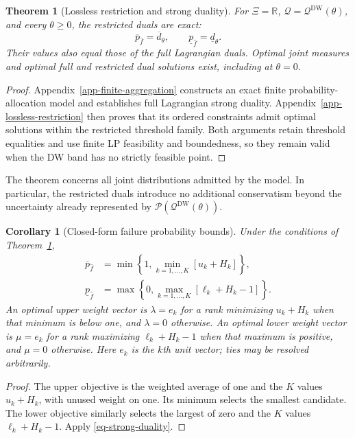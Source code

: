 \documentclass[review,11pt,3p,authoryear,nopreprintline]{elsarticle}
\newtheorem{theorem}{Theorem}
\newtheorem{corollary}{Corollary}
\begin{document}
\begin{theorem}[Lossless restriction and strong duality]
  \label{thm-finite-dual-reformulations}
  For $\Xi=\mathbb R$, $\mathscr Q=\mathscr Q^{\mathrm{DW}}(\theta)$, and every $\theta\ge0$, the restricted duals are exact:
  \begin{equation}
    \overline p_{\hat f}=\overline d_\theta,\qquad
    \underline p_{\hat f}=\underline d_\theta.
    \label{eq-strong-duality}
  \end{equation}
  Their values also equal those of the full Lagrangian duals. Optimal joint measures and optimal full and restricted dual solutions exist, including at $\theta=0$.
\end{theorem}
\begin{proof}
  Appendix~\ref{app-finite-aggregation} constructs an exact finite probability-allocation model and establishes full Lagrangian strong duality. Appendix~\ref{app-lossless-restriction} then proves that its ordered constraints admit optimal solutions within the restricted threshold family. Both arguments retain threshold equalities and use finite LP feasibility and boundedness, so they remain valid when the DW band has no strictly feasible point.
\end{proof}

The theorem concerns all joint distributions admitted by the model. In particular, the restricted duals introduce no additional conservatism beyond the uncertainty already represented by $\mathscr P\left(\mathscr Q^{\mathrm{DW}}(\theta)\right)$.

\begin{corollary}[Closed-form failure probability bounds]
  \label{thm-closed-form-bounds}
  Under the conditions of Theorem~\ref{thm-finite-dual-reformulations},
  \begin{align}
    \overline p_{\hat f}
    &=\min\left\{1,\min_{k=1,\ldots,K}\left[u_k+H_k\right]\right\},
    \label{eq-dw-closed-upper}\\
    \underline p_{\hat f}
    &=\max\left\{0,\max_{k=1,\ldots,K}\left[\ell_k+H_k-1\right]\right\}.
    \label{eq-dw-closed-lower}
  \end{align}
  An optimal upper weight vector is $\lambda=e_k$ for a rank minimizing $u_k+H_k$ when that minimum is below one, and $\lambda=0$ otherwise. An optimal lower weight vector is $\mu=e_k$ for a rank maximizing $\ell_k+H_k-1$ when that maximum is positive, and $\mu=0$ otherwise. Here $e_k$ is the $k$th unit vector; ties may be resolved arbitrarily.
\end{corollary}
\begin{proof}
  The upper objective is the weighted average of one and the $K$ values $u_k+H_k$, with unused weight on one. Its minimum selects the smallest candidate. The lower objective similarly selects the largest of zero and the $K$ values $\ell_k+H_k-1$. Apply \eqref{eq-strong-duality}.
\end{proof}
\end{document}
